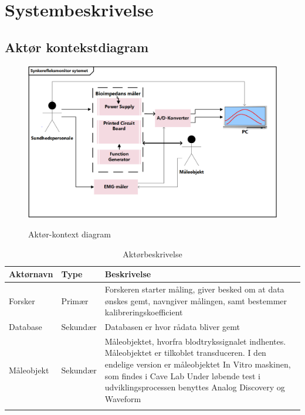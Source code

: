 \documentclass[main.tex]{subfiles}
\begin{document}
\section{Systembeskrivelse}
\subsection{Aktør kontekstdiagram}

\begin{figure}[H]
\centering
{\includegraphics[width=\textwidth]
{Figure/AktoerKontextDiagram}}
\caption{Aktør-kontext diagram}
\label{Use case diagram}
\end{figure}  


\begin{table}[H]
\begin{tabularx}{\textwidth}{l l X}
     Aktørnavn	&	Type		&	Beskrivelse \\ \midrule
     Forsker   	& 	Primær  	& 	Forskeren starter måling, giver besked om at data ønskes gemt, navngiver målingen, samt bestemmer kalibreringskoefficient  \\ 			  \addlinespace[2mm]
     Database	&	Sekundær	&	Databasen er hvor rådata bliver gemt \\   \addlinespace[2mm]
     Måleobjekt	&	Sekundær	&	Måleobjektet, hvorfra blodtrykssignalet indhentes. Måleobjektet er tilkoblet transduceren.
     I den endelige version er måleobjektet In Vitro maskinen, som findes i Cave Lab
     Under løbende test i udviklingsprocessen benyttes Analog Discovery og Waveform \\   \addlinespace[2mm]
     
   
     \bottomrule                                                                                                                   
    \end{tabularx}
    \caption {Aktørbeskrivelse}
    \label{tab:aktoerbeskrivelse}
	
\end{table}
\end{document}
